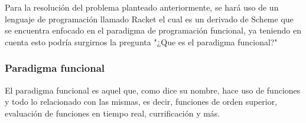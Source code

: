 Para la resolución del problema planteado anteriormente, se hará uso de un lenguaje
 de programación llamado Racket el cual es un derivado de Scheme que se encuentra
  enfocado en el paradigma de programación funcional, ya teniendo en cuenta
   esto podría surgirnos la pregunta "¿Que es el paradigma funcional?" 

   \subsubsection{Paradigma funcional}
   El paradigma funcional es aquel que, como dice su nombre, hace uso de funciones y
   todo lo relacionado con las mismas, es decir, funciones de orden superior, evaluación
    de funciones en tiempo real, currificación y más.\cite{funcional}

